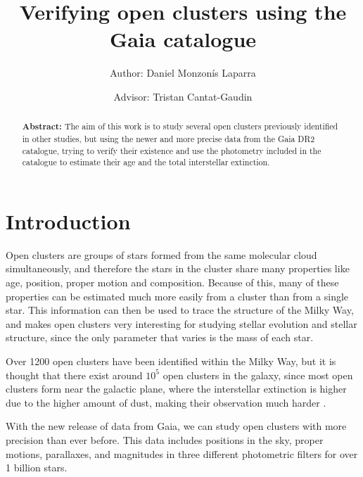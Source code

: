\documentclass[twocolumn]{revtex4}
\begin{document}
\pagestyle{fancy}


\title{Verifying open clusters using the Gaia catalogue}
\author{Author: Daniel Monzonís Laparra}
\author{Advisor: Tristan Cantat-Gaudin}

\begin{abstract}
{\bf Abstract:} The aim of this work is to study several open clusters previously identified in other studies, but using the newer and more precise data from the Gaia DR2 catalogue, trying to verify their existence and use the photometry included in the catalogue to estimate their age and the total interstellar extinction.
\end{abstract}

\maketitle

\section{Introduction}
Open clusters are groups of stars formed from the same molecular cloud simultaneously, and therefore the stars in the cluster share many properties like age, position, proper motion and composition. Because of this, many of these properties can be estimated much more easily from a cluster than from a single star. This information can then be used to trace the structure of the Milky Way, and makes open clusters very interesting for studying stellar evolution and stellar structure, since the only parameter that varies is the mass of each star.

Over 1200 open clusters have been identified within the Milky Way, but it is thought that there exist around $10^5$ open clusters in the galaxy, since most open clusters form near the galactic plane, where the interstellar extinction is higher due to the higher amount of dust, making their observation much harder \cite{star-clusters}.

With the new release of data from Gaia, we can study open clusters with more precision than ever before. This data includes positions in the sky, proper motions, parallaxes, and magnitudes in three different photometric filters for over 1 billion stars.
\end{document}
